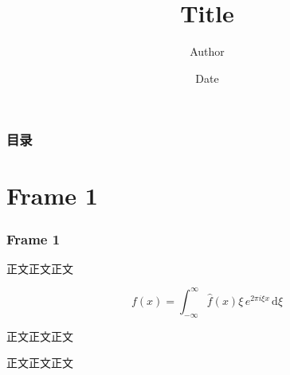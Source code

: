 \documentclass{ctexbeamer}
\title{Title}
\author{Author}
\date{Date}
\newcommand{\ftitle}[1]{\frametitle{\hspace{4ex} {#1}}}
\begin{document}
\begin{frame}    
    \titlepage
\end{frame}

\begin{frame}
    \frametitle{目录}
\end{frame}

\section{Frame 1}
\begin{frame}
    \ftitle{Frame 1}

    正文正文正文

    \begin{equation*}
        f(x) = \int_{-\infty}^\infty  \hat f(x)\xi\,e^{2 \pi i \xi x}  \,\mathrm{d}\xi 
    \end{equation*}

    正文正文正文
    
    正文正文正文

\end{frame}
\end{document}
